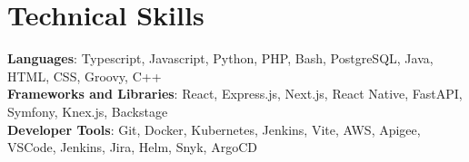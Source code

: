 \documentclass[letterpaper,11pt]{article}
\newcommand{\resumeItem}[1]{
  \item\small{
    {#1 \vspace{-2pt}}
  }
}
\newcommand{\resumeItemListStart}{\begin{itemize}}
\newcommand{\resumeItemListEnd}{\end{itemize}\vspace{-10pt}}
\begin{document}


%
\section{Technical Skills}
 \begin{itemize}[leftmargin=0.15in, label={}]
    \small{\item{
     \textbf{Languages}{: Typescript, Javascript, Python, PHP, Bash, PostgreSQL, Java, HTML, CSS, Groovy, C++} \\
     \textbf{Frameworks and Libraries}{: React, Express.js, Next.js, React Native, FastAPI, Symfony, Knex.js, Backstage} \\
     \textbf{Developer Tools}{: Git, Docker, Kubernetes, Jenkins, Vite, AWS, Apigee, VSCode, Jenkins, Jira, Helm, Snyk, ArgoCD} \\
    }}
 \end{itemize}


\end{document}
